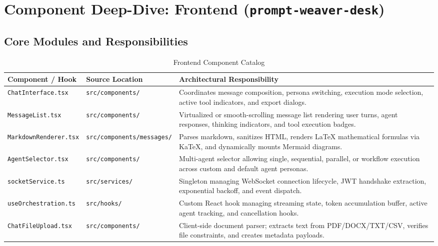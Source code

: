 \documentclass[10pt,a4paper]{article}
\begin{document}
\section{Component Deep-Dive: Frontend (\texttt{prompt-weaver-desk})}

\subsection{Core Modules and Responsibilities}

\begin{table}[h!]
\centering
\small
\begin{tabularx}{\linewidth}{p{4.2cm}p{4.5cm}X}
\toprule
\textbf{Component / Hook} & \textbf{Source Location} & \textbf{Architectural Responsibility} \\
\midrule
\texttt{ChatInterface.tsx} & \texttt{src/components/} & Coordinates message composition, persona switching, execution mode selection, active tool indicators, and export dialogs. \\
\addlinespace
\texttt{MessageList.tsx} & \texttt{src/components/} & Virtualized or smooth-scrolling message list rendering user turns, agent responses, thinking indicators, and tool execution badges. \\
\addlinespace
\texttt{MarkdownRenderer.tsx} & \texttt{src/components/messages/} & Parses markdown, sanitizes HTML, renders LaTeX mathematical formulas via KaTeX, and dynamically mounts Mermaid diagrams. \\
\addlinespace
\texttt{AgentSelector.tsx} & \texttt{src/components/} & Multi-agent selector allowing single, sequential, parallel, or workflow execution across custom and default agent personas. \\
\addlinespace
\texttt{socketService.ts} & \texttt{src/services/} & Singleton managing WebSocket connection lifecycle, JWT handshake extraction, exponential backoff, and event dispatch. \\
\addlinespace
\texttt{useOrchestration.ts} & \texttt{src/hooks/} & Custom React hook managing streaming state, token accumulation buffer, active agent tracking, and cancellation hooks. \\
\addlinespace
\texttt{ChatFileUpload.tsx} & \texttt{src/components/} & Client-side document parser; extracts text from PDF/DOCX/TXT/CSV, verifies file constraints, and creates metadata payloads. \\
\bottomrule
\end{tabularx}
\caption{Frontend Component Catalog}
\end{table}
\end{document}
